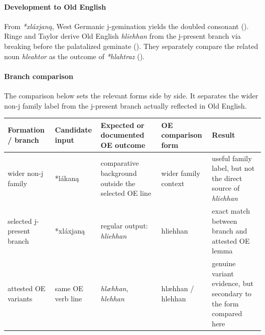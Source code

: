 \documentclass[
  british,
  a4paper,
]{article}
\newcounter{none} %
\begin{document}
\paragraph{Development to Old
English}\label{development-to-old-english-16}

From \emph{*xláxjaną}, West Germanic j-gemination yields the doubled
consonant (). Ringe
and Taylor derive Old English \emph{hliehhan} from the j-present branch
via breaking before the palatalized geminate
(). They
separately compare the related noun \emph{hleahtor} as the outcome of
\emph{*hlahtraz} ().

\paragraph{Branch comparison}\label{branch-comparison}

The comparison below sets the relevant forms side by side. It separates
the wider non-j family label from the j-present branch actually
reflected in Old English.

{\def\LTcaptype{none} %
\begin{longtable}[]{@{}
  >{\raggedright\arraybackslash}p{}
  >{\raggedright\arraybackslash}p{}
  >{\raggedright\arraybackslash}p{}
  >{\raggedright\arraybackslash}p{}
  >{\raggedright\arraybackslash}p{}@{}}
\toprule\noalign{}
\begin{minipage}[b]{\linewidth}\raggedright
Formation / branch
\end{minipage} & \begin{minipage}[b]{\linewidth}\raggedright
Candidate input
\end{minipage} & \begin{minipage}[b]{\linewidth}\raggedright
Expected or documented OE outcome
\end{minipage} & \begin{minipage}[b]{\linewidth}\raggedright
OE comparison form
\end{minipage} & \begin{minipage}[b]{\linewidth}\raggedright
Result
\end{minipage} \\
\midrule\noalign{}
\endhead
\bottomrule\noalign{}
\endlastfoot
wider non-j family & *lákaną & comparative background outside the
selected OE line & wider family context & useful family label, but not
the direct source of \emph{hliehhan} \\
selected j-present branch & *xláxjaną & regular output: \emph{hliehhan}
& hliehhan & exact match between branch and attested OE lemma \\
attested OE variants & same OE verb line & \emph{hlæhhan},
\emph{hlehhan} & hlæhhan / hlehhan & genuine variant evidence, but
secondary to the form compared here \\
\end{longtable}
}
\end{document}
